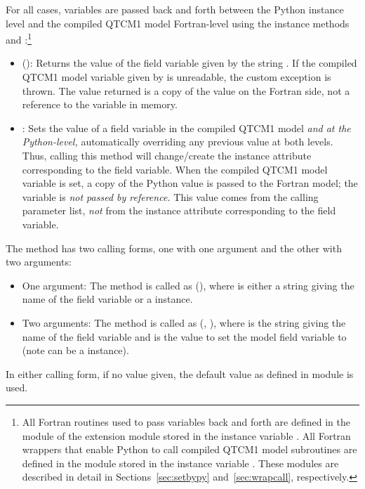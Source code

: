 For all  cases, variables are passed back and
forth between the Python  instance level and the
compiled QTCM1 model Fortran-level using the 
instance methods  and :\footnote%
	{All Fortran routines used to pass variables back and forth are
	defined in the  module of the  extension
	module stored in the  instance variable .
	All Fortran wrappers that enable Python to call compiled QTCM1 model
	subroutines are defined in the  module stored in
	the  instance variable .
	These modules are described in detail in 
	Sections~\ref{sec:setbypy} and~\ref{sec:wrapcall}, respectively.}

\begin{itemize}
\item {}():
	Returns the value of the field variable given by the string
	.  If the compiled QTCM1 model variable given by
	 is unreadable, the
        custom exception 
	 is thrown.
	The value returned is a copy of the value on the Fortran
	side, not a reference to the variable in memory.

\item {}:
	Sets the value of a field variable
	in the compiled QTCM1 model \emph{and at the Python-level,}
	automatically overriding any previous value at both levels.
	Thus, calling this method will change/create the 
	instance attribute corresponding to the field variable.
        When the compiled QTCM1 model variable is set, a copy of the
        Python value is passed to the Fortran model; the
	variable is \emph{not passed by reference.}
	This value comes from the  calling
	parameter list, \emph{not} from the 
        instance attribute corresponding to the field variable.
\end{itemize}

The  method has two calling forms, one with
one argument and the other with two arguments:
\begin{itemize}
\item One argument:  The method is called
	as (), where  
	is either a string giving the name of the field variable or 
	a  instance.

\item Two arguments:  The method is called as
	(, ), where
	 is the string giving the name of the field variable
	and  is the value to set the model field variable to
	(note  can be a  instance).
\end{itemize}
In either calling form, if no value given, the default value as defined
in module  is used.

